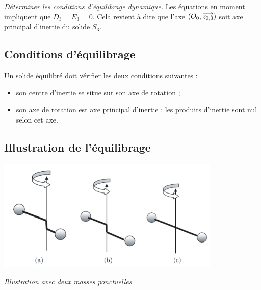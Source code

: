 \documentclass[10pt,fleqn]{article} %
\begin{document}
\begin{exemple}
\textit{Déterminer les conditions d'équilibrage dynamique.}
\ifprof
Les équations en moment impliquent que $D_3=E_3=0$.
Cela revient à dire que l'axe $\left(O_0,\overrightarrow{{z_{0,3}}}\right)$ soit axe principal d'inertie du solide $S_3$.
\else
\vspace{4cm}
\fi
\end{exemple}

\subsection{Conditions d'équilibrage}

\begin{defi}
Un solide équilibré doit vérifier les deux conditions suivantes :
\begin{itemize}
\item son centre d'inertie se situe sur son axe de rotation ; 
\item son axe de rotation est axe principal d'inertie : les produits d'inertie sont nul selon cet axe.
\end{itemize}
\end{defi}

\subsection{Illustration de l'équilibrage}


  \begin{center}
  \includegraphics[width=0.8\textwidth]{images/illustration_equilibrage.png}
  
  \textit{Illustration avec deux masses ponctuelles}
  \end{center}
\end{document}
